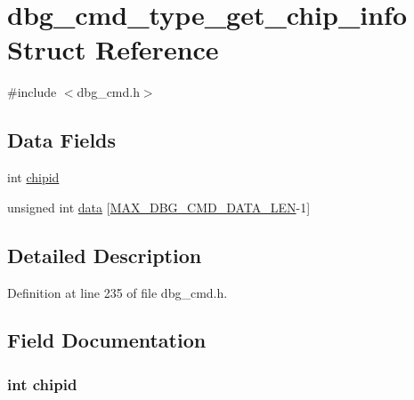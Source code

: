\hypertarget{structdbg__cmd__type__get__chip__info}{\section{dbg\-\_\-cmd\-\_\-type\-\_\-get\-\_\-chip\-\_\-info Struct Reference}
\label{structdbg__cmd__type__get__chip__info}
}


{\ttfamily \#include $<$dbg\-\_\-cmd.\-h$>$}

\subsection*{Data Fields}
\begin{DoxyCompactItemize}
\item 
int \hyperlink{structdbg__cmd__type__get__chip__info_a84275b4ed7fd880ee7d80dfd973ba898}{chipid}
\item 
unsigned int \hyperlink{structdbg__cmd__type__get__chip__info_abceed6826af53b88f4cc936fac1716f0}{data} \mbox{[}\hyperlink{dbg__cmd_8h_a4552ec15033c8a68870cdf80eda5470c}{M\-A\-X\-\_\-\-D\-B\-G\-\_\-\-C\-M\-D\-\_\-\-D\-A\-T\-A\-\_\-\-L\-E\-N}-\/1\mbox{]}
\end{DoxyCompactItemize}


\subsection{Detailed Description}


Definition at line 235 of file dbg\-\_\-cmd.\-h.



\subsection{Field Documentation}
\hypertarget{structdbg__cmd__type__get__chip__info_a84275b4ed7fd880ee7d80dfd973ba898}{
\subsubsection[{chipid}]{\setlength{\rightskip}{0pt plus 5cm}int chipid}}\label{structdbg__cmd__type__get__chip__info_a84275b4ed7fd880ee7d80dfd973ba898}


